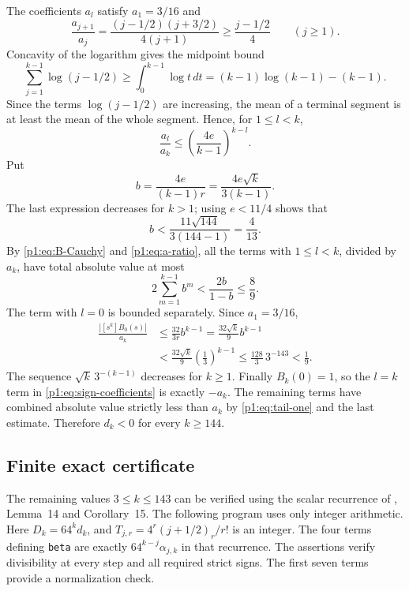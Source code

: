 \documentclass[11pt,a4paper]{article}
\theoremstyle{definition}
\theoremstyle{remark}
\numberwithin{equation}{section}
\begin{document}
The coefficients $a_l$ satisfy $a_1=3/16$ and
\[
 \frac{a_{j+1}}{a_j}
 =\frac{(j-1/2)(j+3/2)}{4(j+1)}
 \geq\frac{j-1/2}{4}\qquad(j\geq1).
\]
Concavity of the logarithm gives the midpoint bound
\[
 \sum_{j=1}^{k-1}\log(j-1/2)
 \geq\int_0^{k-1}\log t\,dt
 =(k-1)\log(k-1)-(k-1).
\]
Since the terms $\log(j-1/2)$ are increasing, the mean of a terminal
segment is at least the mean of the whole segment. Hence, for
$1\leq l<k$,
\begin{equation}\label{p1:eq:a-ratio}
 \frac{a_l}{a_k}
 \leq\left(\frac{4e}{k-1}\right)^{k-l}.
\end{equation}
Put
\[
 b=\frac{4e}{(k-1)r}
   =\frac{4e\sqrt k}{3(k-1)}.
\]
The last expression decreases for $k>1$; using $e<11/4$ shows that
\[
 b<\frac{11\sqrt{144}}{3(144-1)}=\frac4{13}.
\]
By \eqref{p1:eq:B-Cauchy} and \eqref{p1:eq:a-ratio}, all the terms with
$1\leq l<k$, divided by $a_k$, have total absolute value at most
\begin{equation}\label{p1:eq:tail-one}
 2\sum_{m=1}^{k-1}b^m
 <\frac{2b}{1-b}\leq\frac89.
\end{equation}
The term with $l=0$ is bounded separately. Since $a_1=3/16$,
\begin{align*}
 \frac{|[s^k]B_0(s)|}{a_k}
 &\leq\frac{32}{3r}b^{k-1}
 =\frac{32\sqrt k}{9}b^{k-1}\\
 &<\frac{32\sqrt k}{9}\left(\frac13\right)^{k-1}
 \leq\frac{128}{3}\,3^{-143}<\frac19.
\end{align*}
The sequence $\sqrt k\,3^{-(k-1)}$ decreases for $k\geq1$.
Finally $B_k(0)=1$, so the $l=k$ term in
\eqref{p1:eq:sign-coefficients} is exactly $-a_k$.
The remaining terms have combined absolute value strictly less than
$a_k$ by \eqref{p1:eq:tail-one} and the last estimate. Therefore $d_k<0$
for every $k\geq144$.

\subsection{Finite exact certificate}

The remaining values $3\leq k\leq143$ can be verified using the scalar
recurrence of \cite{p1:BrentGlasserGuttmann2019}, Lemma~14 and Corollary~15.
The following program uses only integer arithmetic. Here
$D_k=64^kd_k$, and
$T_{j,r}=4^r(j+1/2)_r/r!$ is an integer. The four terms defining
\texttt{beta} are exactly $64^{k-j}\alpha_{j,k}$ in that recurrence.
The assertions verify divisibility at every step and all required
strict signs. The first seven terms provide a normalization check.
\end{document}

